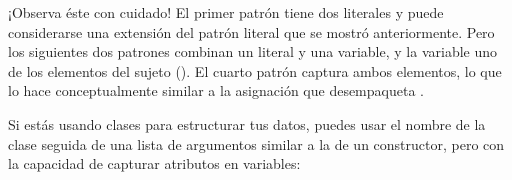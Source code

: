 \documentclass[a5paper,10pt,spanish]{sphinxmanual}
\begin{document}
\sphinxAtStartPar
¡Observa éste con cuidado! El primer patrón tiene dos literales y puede considerarse una extensión del patrón literal que se mostró anteriormente. Pero los siguientes dos patrones combinan un literal y una variable, y la variable  uno de los elementos del sujeto (). El cuarto patrón captura ambos elementos, lo que lo hace conceptualmente similar a la asignación que desempaqueta .

\sphinxAtStartPar
Si estás usando clases para estructurar tus datos, puedes usar el nombre de la clase seguida de una lista de argumentos similar a la de un constructor, pero con la capacidad de capturar atributos en variables:

\begin{sphinxVerbatim}[commandchars=\\\{\}]
 
     
     

 
     
          
          
          
         
         
\end{sphinxVerbatim}
\end{document}
